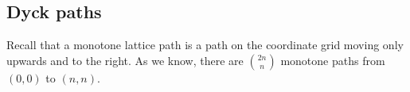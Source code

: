 \subsection{Dyck paths}
Recall that a monotone lattice path is a path on the coordinate grid moving only upwards and to the right.
As we know, there are $\binom{2n}{n}$ monotone paths from $(0,0)$ to $(n,n)$.
